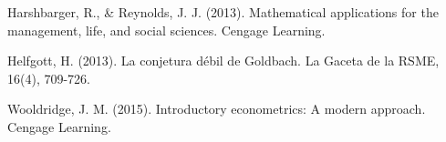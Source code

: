 \documentclass[12pt,a4paper]{article}
\begin{document}
\nocite{*}

\begin{thebibliography}{9}
Harshbarger, R., \& Reynolds, J. J. (2013). Mathematical applications for the management, life, and social sciences. Cengage Learning.

Helfgott, H. (2013). La conjetura débil de Goldbach. La Gaceta de la RSME, 16(4), 709-726.

Wooldridge, J. M. (2015). Introductory econometrics: A modern approach. Cengage Learning.
\end{thebibliography}
\end{document}
